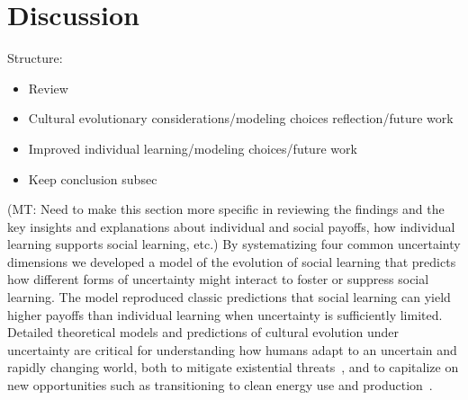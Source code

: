 \documentclass[letterpaper,11.5pt]{scrartcl}
\newcommand{\mt}[1]{{\textcolor{myorange} {({\tiny MT:} #1)}}}
\begin{document}
\section{Discussion}

Structure: 
\begin{itemize}
  \item 
    Review
  \item
    Cultural evolutionary considerations/modeling choices reflection/future work
  \item
    Improved individual learning/modeling choices/future work
  \item
    Keep conclusion subsec
\end{itemize}

\mt{Need to make this section more specific in reviewing the findings and 
the key insights and explanations about individual and social payoffs, how
individual learning supports social learning, etc.} By
systematizing four common uncertainty dimensions we developed a model of the
evolution of social learning that predicts how different forms of uncertainty might
interact to foster or suppress social learning.  The model reproduced classic
predictions that social learning can yield higher payoffs than individual learning
when uncertainty is sufficiently limited.  
Detailed theoretical
models and predictions of cultural evolution under uncertainty are critical for
understanding how humans adapt to an uncertain and rapidly changing world, both to
mitigate existential threats~\cite{Moya2020,Jones2021}, and to capitalize on new
opportunities such as transitioning to clean energy use and
production~\cite{NatureEnergyEditorialPromisesPremises2018,Brisbois2022}.

\end{document}
